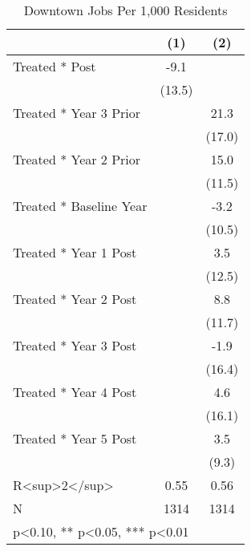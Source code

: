 \begin{table}[htbp]\centering
\def\sym#1{\ifmmode^{#1}\else\(^{#1}\)\fi}
\caption{Downtown Jobs Per 1,000 Residents}
\begin{tabular}{l*{2}{c}}
\hline\hline
            &\multicolumn{1}{c}{(1)}   &\multicolumn{1}{c}{(2)}   \\
\hline
Treated * Post&        -9.1   &               \\
            &      (13.5)   &               \\
Treated * Year 3 Prior&               &        21.3   \\
            &               &      (17.0)   \\
Treated * Year 2 Prior&               &        15.0   \\
            &               &      (11.5)   \\
Treated * Baseline Year&               &        -3.2   \\
            &               &      (10.5)   \\
Treated * Year 1 Post&               &         3.5   \\
            &               &      (12.5)   \\
Treated * Year 2 Post&               &         8.8   \\
            &               &      (11.7)   \\
Treated * Year 3 Post&               &        -1.9   \\
            &               &      (16.4)   \\
Treated * Year 4 Post&               &         4.6   \\
            &               &      (16.1)   \\
Treated * Year 5 Post&               &         3.5   \\
            &               &       (9.3)   \\
\hline
R<sup>2</sup>&        0.55   &        0.56   \\
N           &        1314   &        1314   \\
\hline\hline
\multicolumn{3}{l}{\footnotesize * p<0.10, ** p<0.05, *** p<0.01}\\
\end{tabular}
\end{table}
